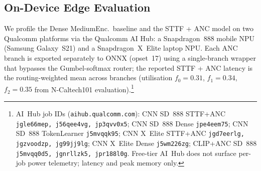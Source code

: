 \documentclass{article}
\begin{document}
\subsection{On-Device Edge Evaluation}

We profile the Dense MediumEnc.\ baseline and the STTF + ANC model on two Qualcomm platforms via the Qualcomm AI Hub: a Snapdragon~888 mobile NPU (Samsung Galaxy~S21) and a Snapdragon~X~Elite laptop NPU. Each ANC branch is exported separately to ONNX (opset~17) using a single-branch wrapper that bypasses the Gumbel-softmax router; the reported STTF + ANC latency is the routing-weighted mean across branches (utilisation $f_0\!=\!0.31$, $f_1\!=\!0.34$, $f_2\!=\!0.35$ from N-Caltech101 evaluation).\footnote{AI~Hub job IDs (\texttt{aihub.qualcomm.com}): CNN SD~888 STTF+ANC \texttt{jgle66mep, j56qee4vg, jp3qvv0x5}; CNN SD~888 Dense \texttt{jpe4eem75}; CNN SD~888 TokenLearner \texttt{j5mvqqk95}; CNN X~Elite STTF+ANC \texttt{jgd7eerlg, jgzvoodzp, jg99jj9lg}; CNN X~Elite Dense \texttt{j5wm226zg}; CLIP+ANC SD~888 \texttt{j5mvqq0d5, jgnrllzk5, jpr188l0g}. Free-tier AI~Hub does not surface per-job power telemetry; latency and peak memory only.}
\end{document}
